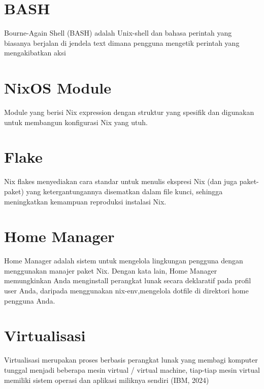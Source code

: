 \documentclass[10pt,]{report}
\begin{document}
\section{BASH}
\begin{adjustwidth}{20pt}{}
	\vspace{-3mm}
	Bourne-Again Shell (BASH) adalah Unix-shell dan bahasa perintah yang biasanya
	berjalan di jendela text dimana pengguna mengetik perintah yang mengakibatkan
	aksi
\end{adjustwidth}
\section{NixOS Module}
\begin{adjustwidth}{20pt}{}
	\vspace{-3mm}
	Module yang berisi Nix expression dengan struktur yang spesifik dan digunakan
	untuk membangun konfigurasi Nix yang utuh.
\end{adjustwidth}
\section{Flake}
\begin{adjustwidth}{20pt}{}
	\vspace{-3mm} Nix flakes menyediakan cara standar untuk menulis ekspresi Nix (dan juga paket-paket) yang ketergantungannya disematkan dalam file kunci, sehingga meningkatkan kemampuan reproduksi instalasi Nix.
\end{adjustwidth}
\section{Home Manager}
\begin{adjustwidth}{20pt}{}
	\vspace{-3mm}
	Home Manager adalah sistem untuk mengelola lingkungan pengguna dengan
	menggunakan manajer paket Nix. Dengan kata lain, Home Manager memungkinkan
	Anda menginstall perangkat lunak secara deklaratif pada profil user Anda,
	daripada menggunakan nix-env,mengelola dotfile di direktori home pengguna
	Anda.
\end{adjustwidth}
\section{Virtualisasi}
\begin{adjustwidth}{20pt}{}
	\vspace{-3mm}
	Virtualisasi merupakan proses berbasis perangkat lunak yang membagi komputer
	tunggal menjadi beberapa mesin virtual / virtual machine, tiap-tiap mesin
	virtual memiliki sistem operasi dan aplikasi miliknya sendiri (IBM, 2024)
\end{adjustwidth}
\end{document}
